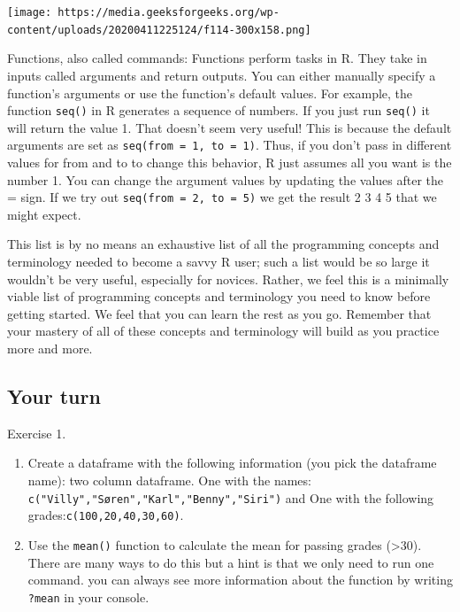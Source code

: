 \documentclass[
]{book}
\begin{document}
\texttt{[image: https://media.geeksforgeeks.org/wp-content/uploads/20200411225124/f114-300x158.png]}

Functions, also called commands: Functions perform tasks in R. They take
in inputs called arguments and return outputs. You can either manually
specify a function's arguments or use the function's default values. For
example, the function \texttt{seq()} in R generates a sequence of
numbers. If you just run \texttt{seq()} it will return the value 1. That
doesn't seem very useful! This is because the default arguments are set
as \texttt{seq(from\ =\ 1,\ to\ =\ 1)}. Thus, if you don't pass in
different values for from and to to change this behavior, R just assumes
all you want is the number 1. You can change the argument values by
updating the values after the = sign. If we try out
\texttt{seq(from\ =\ 2,\ to\ =\ 5)} we get the result 2 3 4 5 that we
might expect.

This list is by no means an exhaustive list of all the programming
concepts and terminology needed to become a savvy R user; such a list
would be so large it wouldn't be very useful, especially for novices.
Rather, we feel this is a minimally viable list of programming concepts
and terminology you need to know before getting started. We feel that
you can learn the rest as you go. Remember that your mastery of all of
these concepts and terminology will build as you practice more and more.

\hypertarget{exercise1}{%
\subsection{Your turn}\label{exercise1}}

Exercise 1.

\begin{enumerate}
\def\labelenumi{\arabic{enumi}.}
\item
  Create a dataframe with the following information (you pick the
  dataframe name): two column dataframe. One with the names:
  \texttt{c("Villy","Søren","Karl","Benny","Siri")} and One with the
  following grades:\texttt{c(100,20,40,30,60)}.
\item
  Use the \texttt{mean()} function to calculate the mean for passing
  grades (\textgreater30). There are many ways to do this but a hint is
  that we only need to run one command. you can always see more
  information about the function by writing \texttt{?mean} in your
  console.
\end{enumerate}
\end{document}
